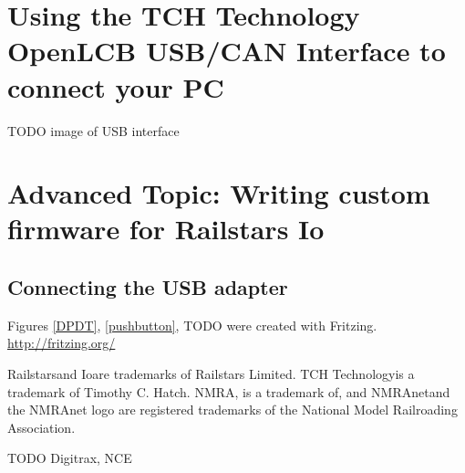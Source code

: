 \documentclass[12pt]{book}
\begin{document}

\chapter{Using the TCH Technology OpenLCB USB/CAN Interface to connect your PC}

TODO image of USB interface

\chapter{Advanced Topic: Writing custom firmware for Railstars Io}

\section{Connecting the USB adapter}
\label{FTDI}



\printindex

\newpage
Figures \ref{DPDT}, \ref{pushbutton}, TODO were created with Fritzing. \url{http://fritzing.org/}

Railstars\texttrademark and Io\texttrademark are trademarks of Railstars Limited. TCH Technology\texttrademark is a trademark of Timothy C. Hatch. NMRA\texttrademark, is a trademark of, and NMRAnet\textregistered and the NMRAnet logo are registered trademarks of the National Model Railroading Association.

TODO Digitrax, NCE
\end{document}
